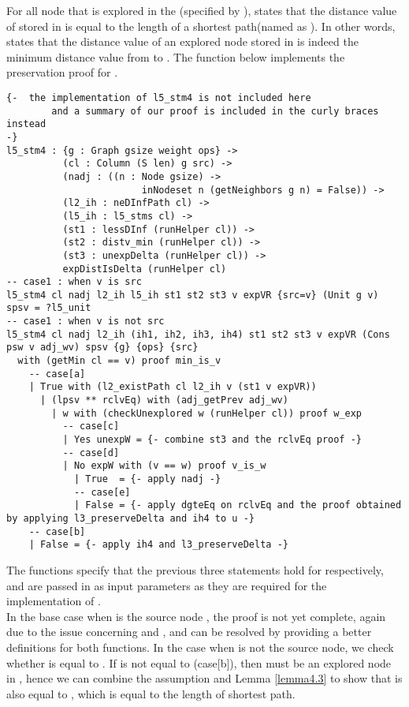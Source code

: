 For all node  that is explored in the  (specified by ),  states that the distance value of  stored in  is equal to the length of a shortest  path(named as ). In other words,  states that the distance value of an explored node  stored in  is indeed the minimum distance value from  to . The function  below implements the preservation proof for .
\begin{lstlisting}
{-  the implementation of l5_stm4 is not included here 
		and a summary of our proof is included in the curly braces instead
-}
l5_stm4 : {g : Graph gsize weight ops} ->
          (cl : Column (S len) g src) ->
          (nadj : ((n : Node gsize) -> 
          				inNodeset n (getNeighbors g n) = False)) ->
          (l2_ih : neDInfPath cl) ->
          (l5_ih : l5_stms cl) ->
          (st1 : lessDInf (runHelper cl)) ->
          (st2 : distv_min (runHelper cl)) ->
          (st3 : unexpDelta (runHelper cl)) ->
          expDistIsDelta (runHelper cl)
-- case1 : when v is src
l5_stm4 cl nadj l2_ih l5_ih st1 st2 st3 v expVR {src=v} (Unit g v) spsv = ?l5_unit
-- case1 : when v is not src
l5_stm4 cl nadj l2_ih (ih1, ih2, ih3, ih4) st1 st2 st3 v expVR (Cons psw v adj_wv) spsv {g} {ops} {src}
  with (getMin cl == v) proof min_is_v
  	-- case[a]
    | True with (l2_existPath cl l2_ih v (st1 v expVR))
      | (lpsv ** rclvEq) with (adj_getPrev adj_wv)
        | w with (checkUnexplored w (runHelper cl)) proof w_exp
          -- case[c]
          | Yes unexpW = {- combine st3 and the rclvEq proof -} 
          -- case[d]
          | No expW with (v == w) proof v_is_w
            | True  = {- apply nadj -}
            -- case[e]
            | False = {- apply dgteEq on rclvEq and the proof obtained by applying l3_preserveDelta and ih4 to u -}
    -- case[b]
    | False = {- apply ih4 and l3_preserveDelta -}
\end{lstlisting}

The functions  specify that the previous three statements hold for  respectively, and are passed in as input parameters as they are required for the implementation of .
\\

In the base case when  is the source node , the proof is not yet complete, again due to the issue concerning  and , and can be resolved by providing a better definitions for both functions. In the case when  is not the source node, we check whether  is equal to . If  is not equal to (case[b]), then  must be an explored node in , hence we can combine the assumption  and Lemma \ref{lemma4.3}  to show that  is also equal to , which is equal to the length of shortest  path. 
\\

